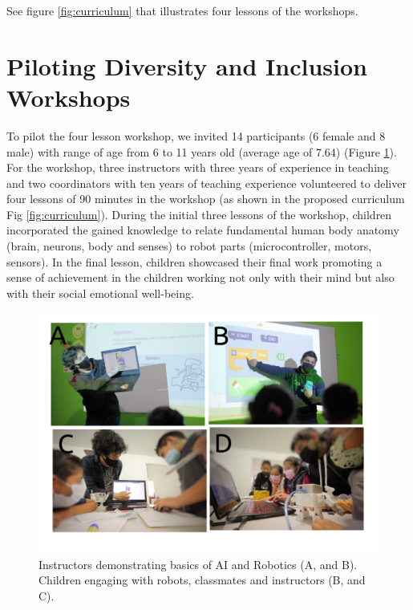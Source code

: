 \documentclass[conference]{IEEEtran}
\begin{document}
See figure \ref{fig:curriculum} that illustrates four lessons of the workshops.



\section{Piloting Diversity and Inclusion Workshops}
To pilot the four lesson workshop, we invited 14 participants (6 female and 8 male) with range of age from 6 to 11 years old (average age of 7.64) (Figure \ref{fig:pilot}). 
For the workshop, three instructors with three years of experience in teaching and two coordinators with ten years of teaching experience volunteered to deliver four lessons of 90 minutes in the workshop (as shown in the proposed curriculum Fig \ref{fig:curriculum}).
During the initial three lessons of the workshop, children incorporated the gained knowledge to relate fundamental human body anatomy (brain, neurons, body and senses) to robot parts (microcontroller, motors, sensors). 
In the final lesson, children showcased their final work promoting a sense of achievement in the children working not only with their mind but also with their social emotional well-being. 
\begin{figure}[tbp]
    \includegraphics[width=\linewidth]{piloting-workshops/versions/drawing-v00.png} %
    \caption{
        Instructors demonstrating basics of AI and Robotics (A, and B). 
        Children engaging with robots, classmates and instructors (B, and C).
        }
    \label{fig:pilot}
\end{figure}
\end{document}

